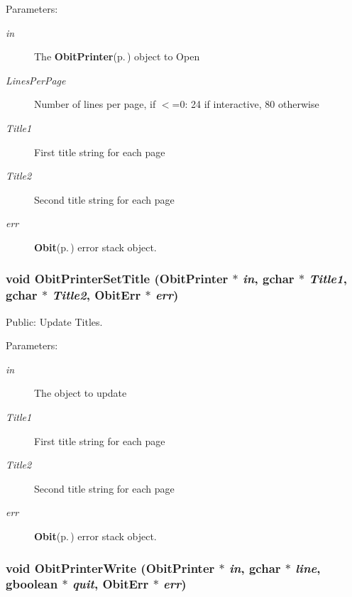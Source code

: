 \begin{Desc}
\item[Parameters:]
\begin{description}
\item[{\em in}]The {\bf Obit\-Printer}{\rm (p.\,\pageref{structObitPrinter})} object to Open \item[{\em Lines\-Per\-Page}]Number of lines per page, if $<$=0: 24 if interactive, 80 otherwise \item[{\em Title1}]First title string for each page \item[{\em Title2}]Second title string for each page \item[{\em err}]{\bf Obit}{\rm (p.\,\pageref{structObit})} error stack object. \end{description}
\end{Desc}
\subsubsection{\setlength{\rightskip}{0pt plus 5cm}void Obit\-Printer\-Set\-Title ({\bf Obit\-Printer} $\ast$ {\em in}, gchar $\ast$ {\em Title1}, gchar $\ast$ {\em Title2}, {\bf Obit\-Err} $\ast$ {\em err})}\label{ObitPrinter_8h_a18}


Public: Update Titles. 

\begin{Desc}
\item[Parameters:]
\begin{description}
\item[{\em in}]The object to update \item[{\em Title1}]First title string for each page \item[{\em Title2}]Second title string for each page \item[{\em err}]{\bf Obit}{\rm (p.\,\pageref{structObit})} error stack object. \end{description}
\end{Desc}
\subsubsection{\setlength{\rightskip}{0pt plus 5cm}void Obit\-Printer\-Write ({\bf Obit\-Printer} $\ast$ {\em in}, gchar $\ast$ {\em line}, gboolean $\ast$ {\em quit}, {\bf Obit\-Err} $\ast$ {\em err})}\label{ObitPrinter_8h_a16}


